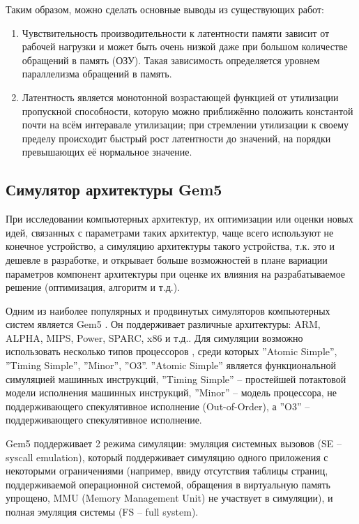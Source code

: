     Таким образом, можно сделать основные выводы из существующих работ:
    \begin{enumerate}
        \item Чувствительность производительности к латентности памяти зависит от рабочей нагрузки и может
            быть очень низкой даже при большом количестве обращений в память (ОЗУ). Такая зависимость
            определяется уровнем параллелизма обращений в память.
        \item Латентность является монотонной возрастающей функцией от утилизации пропускной способности,
            которую можно приближённо положить константой почти на всём интеравале утилизации;
            при стремлении утилизации к своему пределу происходит быстрый рост латентности до значений,
            на порядки превышающих её нормальное значение.
    \end{enumerate}

\subsection{Симулятор архитектуры Gem5}

    При исследовании компьютерных архитектур, их оптимизации или оценки новых идей, связанных с
    параметрами таких архитектур, чаще всего используют не конечное устройство, а симуляцию
    архитектуры такого устройства, т.к. это и дешевле в разработке,
    и открывает больше возможностей в плане вариации параметров компонент архитектуры при оценке
    их влияния на разрабатываемое решение (оптимизация, алгоритм и т.д.).

    Одним из наиболее популярных и продвинутых симуляторов компьютерных систем является Gem5
    \cite{binkert2011gem5}. Он поддерживает различные архитектуры: ARM, ALPHA, MIPS,
    Power, SPARC, x86 и т.д.. Для симуляции возможно использовать несколько типов процессоров
    \cite{gem52017ArchExpl}, среди которых ''Atomic Simple'', ''Timing Simple'', ''Minor'',
    ''O3''. ''Atomic Simple'' является функциональной симуляцией машинных инструкций,
    ''Timing Simple'' -- простейшей потактовой модели исполнения машинных инструкций,
    ''Minor'' -- модель процессора, не поддерживающего спекулятивное исполнение (Out-of-Order),
    а ''O3'' -- поддерживающего спекулятивное исполнение.

    Gem5 поддерживает 2 режима симуляции: эмуляция системных вызовов (SE -- syscall emulation), который
    поддерживает симуляцию одного приложения с некоторыми ограничениями (например, ввиду отсутствия таблицы
    страниц, поддерживаемой операционной системой, обращения в виртуальную память упрощено, MMU (Memory
    Management Unit) не участвует в симуляции), и полная эмуляция системы (FS -- full system).

